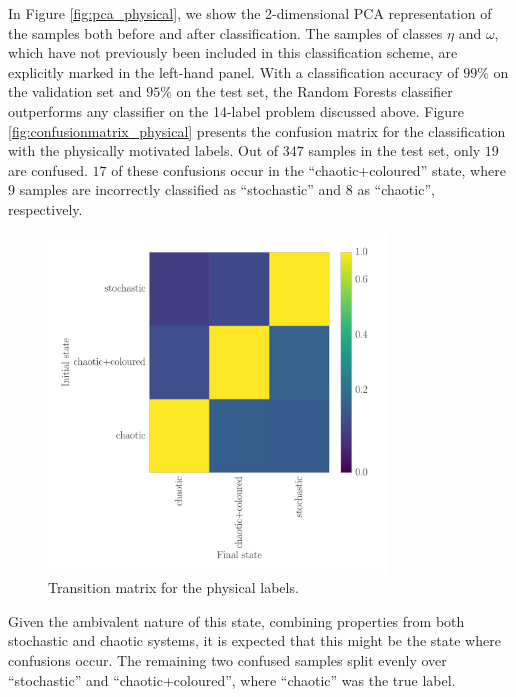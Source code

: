 \documentclass[12pt]{emulateapj}
\begin{document}
In Figure \ref{fig:pca_physical}, we show the 2-dimensional PCA representation of the samples both before and after classification. The samples of classes $\eta$ and $\omega$, which have not previously been included in this classification scheme, are explicitly marked in the left-hand panel. 
With a classification accuracy of $99\%$ on the validation set and $95\%$ on the test set, the Random Forests classifier outperforms any classifier on the 14-label problem discussed above. Figure \ref{fig:confusionmatrix_physical} presents the confusion matrix for the classification with the physically motivated labels.
Out of $347$ samples in the test set, only $19$ are confused. $17$ of these confusions occur in the ``chaotic+coloured'' state, where $9$ samples are incorrectly 
classified as ``stochastic'' and $8$ as ``chaotic'', respectively. 
\begin{figure}[htbp]
\begin{center}
\includegraphics[width=9cm]{grs1915_supervised_phys_transmat.pdf}
\caption{Transition matrix for the physical labels.} 
\label{fig:transmat_phys}
\end{center}
\end{figure}
Given the ambivalent nature of this state, combining properties from both stochastic and chaotic systems, it is expected that this might be the state where confusions occur. The remaining two confused samples split evenly over ``stochastic'' and ``chaotic+coloured'', where ``chaotic'' was the true label.
\end{document}
